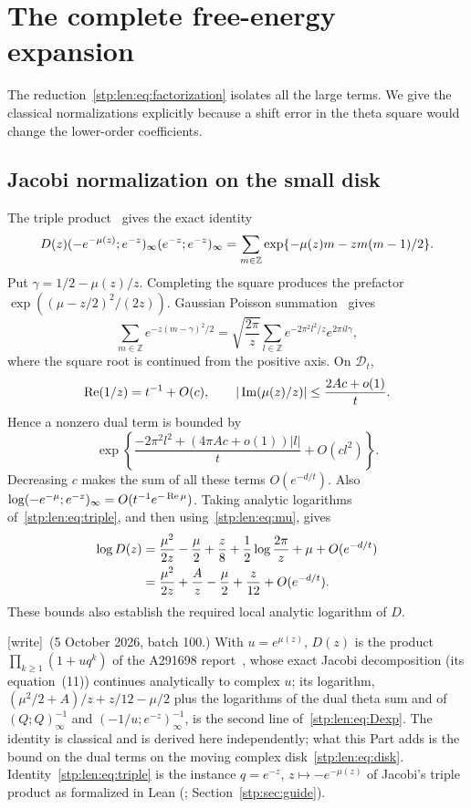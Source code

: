 \documentclass[11pt]{article}
\theoremstyle{remark}\newtheorem{remark}[theorem]{Remark}
\newcommand{\ZZ}{\mathbb Z}\newcommand{\NN}{\mathbb N}\newcommand{\CC}{\mathbb C}
\newcommand{\wtag}{\textup{[write]}}
\begin{document}
\section{The complete free-energy expansion}\label{stp:len:sec:freeenergy}
The reduction~\eqref{stp:len:eq:factorization} isolates all the large terms. We give the classical normalizations explicitly because a shift error in the theta square would change the lower-order coefficients.

\subsection{Jacobi normalization on the small disk}
The triple product~\cite{dlmfjacobi} gives the exact identity
\begin{equation}\label{stp:len:eq:triple}
 D(z)\poc{-e^{-\mu(z)}}{e^{-z}}\poc{e^{-z}}{e^{-z}}
 =\sum_{m\in\ZZ}\exp\{-\mu(z)m-zm(m-1)/2\}.
\end{equation}
Put $\gamma=1/2-\mu(z)/z$. Completing the square produces the prefactor
$\exp((\mu-z/2)^2/(2z))$. Gaussian Poisson summation~\cite{dlmftheta} gives
\[
 \sum_{m\in\ZZ}e^{-z(m-\gamma)^2/2}
 =\sqrt{\frac{2\pi}{z}}\sum_{l\in\ZZ}e^{-2\pi^2l^2/z}e^{2\pi i l\gamma},
\]
where the square root is continued from the positive axis. On $\mathcal D_t$,
\[
 \operatorname{Re}(1/z)=t^{-1}+O(c),\qquad
 |\operatorname{Im}(\mu(z)/z)|\le\frac{2Ac+o(1)}t.
\]
Hence a nonzero dual term is bounded by
\[
 \exp\left\{\frac{-2\pi^2l^2+(4\pi Ac+o(1))|l|}{t}+O(cl^2)\right\}.
\]
Decreasing $c$ makes the sum of all these terms $O(e^{-d/t})$. Also
$\log(-e^{-\mu};e^{-z})_\infty=O(t^{-1}e^{-\operatorname{Re}\mu})$.
Taking analytic logarithms of~\eqref{stp:len:eq:triple}, and then using~\eqref{stp:len:eq:mu}, gives
\begin{align}
 \log D(z)
 &=\frac{\mu^2}{2z}-\frac\mu2+\frac z8
    +\frac12\log\frac{2\pi}{z}+\mu+O(e^{-d/t})\notag\\
 &=\frac{\mu^2}{2z}+\frac A z-\frac\mu2+\frac z{12}+O(e^{-d/t}).\label{stp:len:eq:Dexp}
\end{align}
These bounds also establish the required local analytic logarithm of $D$.

\wtag\ (5 October 2026, batch 100.) With $u=e^{\mu(z)}$, $D(z)$ is the
product $\prod_{k\ge1}(1+uq^k)$ of the A291698 report~\cite{priorfugacity},
whose exact Jacobi decomposition (its equation~(11)) continues
analytically to complex $u$; its logarithm,
$(\mu^2/2+A)/z+z/12-\mu/2$ plus the logarithms of the dual theta sum and of
$(Q;Q)_\infty^{-1}$ and $(-1/u;e^{-z})_\infty^{-1}$, is the second line
of~\eqref{stp:len:eq:Dexp}. The identity is classical and is derived here
independently; what this Part adds is the bound on the dual terms on the
moving complex disk~\eqref{stp:len:eq:disk}. Identity~\eqref{stp:len:eq:triple}
is the instance $q=e^{-z}$, $z\mapsto-e^{-\mu(z)}$ of Jacobi's triple
product as formalized in Lean
(; Section~\ref{stp:sec:guide}).
\end{document}

